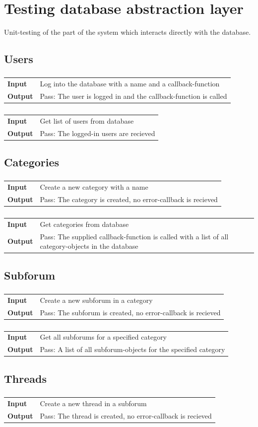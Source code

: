 \documentclass[a4paper, 12pt, titlepage]{article}
\newcommand{\testcase}[2]{
	\subsubsection{}
	\begin{tabular}{l p{11cm}}
	\bf{Input} & 
		#1\\
	\bf{Output} & 
		#2\\
	\end{tabular}
}
\begin{document}
	\section{Testing database abstraction layer}
	Unit-testing of the part of the system which interacts directly with the database.

	\subsection{Users}

		\testcase
		{
			Log into the database with a name and a callback-function
		}{
			Pass: The user is logged in and the callback-function is called
		}

		\testcase
		{
			Get list of users from database
		}{
			Pass: The logged-in users are recieved
		}

	\subsection{Categories}

		\testcase
		{
			Create a new category with a name 
		}{
			Pass: The category is created, no error-callback is recieved
		}

		\testcase
		{
			Get categories from database
		}{
			Pass: The supplied callback-function is called with a list of all category-objects in the database
		}

	\subsection{Subforum}

		\testcase
		{
			Create a new subforum in a category
		}{
			Pass: The subforum is created, no error-callback is recieved
		}

		\testcase
		{
			Get all subforums for a specified category
		}{
			Pass: A list of all subforum-objects for the specified category
		}

	\subsection{Threads}

		\testcase
		{
			Create a new thread in a subforum
		}{
			Pass: The thread is created, no error-callback is recieved
		}
\end{document}
